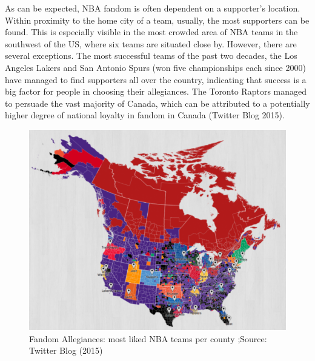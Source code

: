 \documentclass[
]{article}
\begin{document}
As can be expected, NBA fandom is often dependent on a supporter's
location. Within proximity to the home city of a team, usually, the most
supporters can be found. This is especially visible in the most crowded
area of NBA teams in the southwest of the US, where six teams are
situated close by. However, there are several exceptions. The most
successful teams of the past two decades, the Los Angeles Lakers and San
Antonio Spurs (won five championships each since 2000) have managed to
find supporters all over the country, indicating that success is a big
factor for people in choosing their allegiances. The Toronto Raptors
managed to persuade the vast majority of Canada, which can be attributed
to a potentially higher degree of national loyalty in fandom in Canada
(Twitter Blog 2015).

\begin{figure}

{\centering \includegraphics[width=7.85in,height=0.4\textheight]{../output/Figure 1 - NBA Fandoms Map (Twitter Blog 2015)} 

}

\caption{Fandom Allegiances: most liked NBA teams per county ;Source: Twitter Blog (2015)}\label{fig:unnamed-chunk-2-1}
\end{figure}
\end{document}
